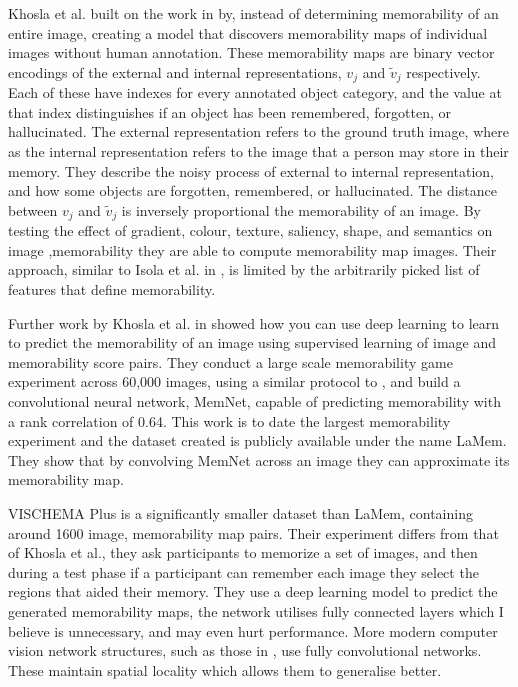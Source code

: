 \documentclass{UoYCSproject}
\begin{document}
Khosla et al. \cite{NIPS12_Khosla} built on the work in \cite{Isola2011, IsolaParikhTorralbaOliva2011} by, instead of determining memorability of an entire image, creating a model that discovers memorability maps of individual images without human annotation. These memorability maps are binary vector encodings of the external and internal representations, $v_j$ and $\tilde{v}_j$ respectively. Each of these have indexes for every annotated object category, and the value at that index distinguishes if an object has been remembered, forgotten, or hallucinated. The external representation refers to the ground truth image, where as the internal representation refers to the image that a person may store in their memory. They describe the noisy process of external to internal representation, and how some objects are forgotten, remembered, or hallucinated. The distance between $v_j$ and $\tilde{v}_j$ is inversely proportional the memorability of an image. By testing the effect of gradient, colour, texture, saliency, shape, and semantics on image ,memorability they are able to compute memorability map images. Their approach, similar to Isola et al. in \cite{Isola2011, IsolaParikhTorralbaOliva2011}, is limited by the arbitrarily picked list of features that define memorability.  

Further work by Khosla et al. in \cite{ICCV15_Khosla} showed how you can use deep learning to learn to predict the memorability of an image using supervised learning of image and memorability score pairs. They conduct a large scale memorability game experiment across 60,000 images, using a similar protocol to \cite{isola2014memorability}, and build a convolutional neural network, MemNet, capable of predicting memorability with a rank correlation of 0.64. This work is to date the largest memorability experiment and the dataset created is publicly available under the name LaMem. They show that by convolving MemNet across an image they can approximate its memorability map. 

VISCHEMA Plus is a significantly smaller dataset than LaMem, containing around 1600 image, memorability map pairs. Their experiment differs from that of Khosla et al., they ask participants to memorize a set of images, and then during a test phase if a participant can remember each image they select the regions that aided their memory. They use a deep learning model to predict the generated memorability maps, the network utilises fully connected layers which I believe is unnecessary, and may even hurt performance. More modern computer vision network structures, such as those in \cite{ronneberger2015unet, goodfellow2014generative, ho2020denoising, isola2018imagetoimage, saharia2022palette}, use fully convolutional networks. These maintain spatial locality which allows them to generalise better.
\end{document}
